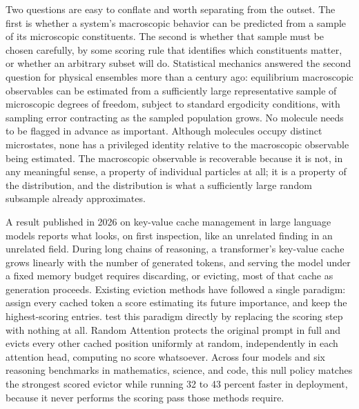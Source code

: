 \documentclass[11pt]{article}
\begin{document}
Two questions are easy to conflate and worth separating from the outset. The first is whether a system's macroscopic behavior can be predicted from a sample of its microscopic constituents. The second is whether that sample must be chosen carefully, by some scoring rule that identifies which constituents matter, or whether an arbitrary subset will do. Statistical mechanics answered the second question for physical ensembles more than a century ago: equilibrium macroscopic observables can be estimated from a sufficiently large representative sample of microscopic degrees of freedom, subject to standard ergodicity conditions, with sampling error contracting as the sampled population grows. No molecule needs to be flagged in advance as important. Although molecules occupy distinct microstates, none has a privileged identity relative to the macroscopic observable being estimated. The macroscopic observable is recoverable because it is not, in any meaningful sense, a property of individual particles at all; it is a property of the distribution, and the distribution is what a sufficiently large random subsample already approximates.

A result published in 2026 on key-value cache management in large language models reports what looks, on first inspection, like an unrelated finding in an unrelated field. During long chains of reasoning, a transformer's key-value cache grows linearly with the number of generated tokens, and serving the model under a fixed memory budget requires discarding, or evicting, most of that cache as generation proceeds. Existing eviction methods have followed a single paradigm: assign every cached token a score estimating its future importance, and keep the highest-scoring entries. \citet{wang2026random} test this paradigm directly by replacing the scoring step with nothing at all. Random Attention protects the original prompt in full and evicts every other cached position uniformly at random, independently in each attention head, computing no score whatsoever. Across four models and six reasoning benchmarks in mathematics, science, and code, this null policy matches the strongest scored evictor while running 32 to 43 percent faster in deployment, because it never performs the scoring pass those methods require.
\end{document}
